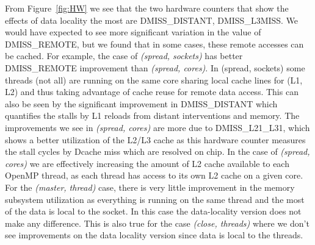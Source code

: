 From Figure~\ref{fig:HW} we see that the two hardware counters that show the effects of data locality the most are DMISS\_DISTANT, DMISS\_L3MISS.
We would have expected to see more significant variation in the value of DMISS\_REMOTE, but we found that in some cases, these remote accesses can be cached.
For example, the case of \textit{(spread, sockets)} has better DMISS\_REMOTE improvement than  \textit{(spread, cores)}. 
In (spread, sockets) some threads (not all) are running on the same core sharing local cache lines for (L1, L2) and thus taking advantage of cache reuse for remote data access. 
This can also be seen by the significant improvement in DMISS\_DISTANT which quantifies the stalls by L1 reloads from distant interventions and memory. 
The improvements we see in  \textit{(spread, cores)} are more due to DMISS\_L21\_L31, which shows a better utilization of the L2/L3 cache as this hardware counter measures the stall cycles by Dcache miss which are resolved on chip. 
In the case of  \textit{(spread, cores)} we are effectively increasing the amount of 
L2 cache available to each OpenMP thread, as each thread has access to its own L2 cache on a given core. 
For the \textit{(master, thread)} case, there is very little improvement in the memory subsystem utilization as everything is running on the same thread and the most of the data is local to the socket. In this case the data-locality version does not make any difference. This is also true for the case  \textit{(close, threads)} where
 we don't see improvements on the data locality version since data is local to the threads.


